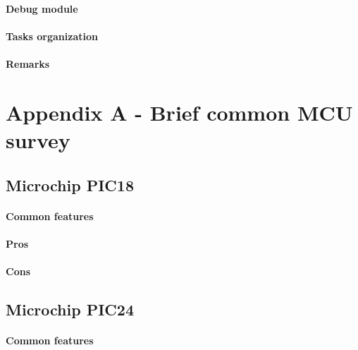 \documentclass[a4paper,10pt]{article}
\begin{document}
\begin{multicols}{2}
\paragraph{Debug module}
\TODO


\paragraph{Tasks organization}
\TODO


\paragraph{Remarks}
\TODO


\section{Appendix A - Brief common MCU survey}

\TODO


\subsection{Microchip PIC18}

\TODO


\paragraph{Common features}
\TODO


\paragraph{Pros}
\TODO


\paragraph{Cons}
\TODO


\subsection{Microchip PIC24}

\TODO


\paragraph{Common features}
\TODO



\end{multicols}
\end{document}
